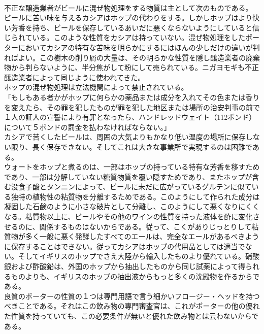 \documentclass[8pt]{extreport}
\begin{document}
\begin{CJK}{UTF8}{min}
\\	不正な醸造業者がビールに混ぜ物処理をする物質は主として次のものである。
\\	ビールに苦い味を与えるカシアはホップの代わりをする。しかしホップはより快い芳香を持ち、ビールを保存しているあいだに悪くならないようにしていると信じられている。このような性質をカシアは持っていない。混ぜ物処理をしたポーターにおいてカシアの特有な苦味を明らかにするにはほんの少しだけの違いが判ればよい。この樹木の削り屑の大量は、その明らかな性質を隠し醸造業者の廃棄物から判らないように、半分焦がして粉にして売られている。ニガヨモギも不正醸造業者によって同じように使われてきた。
\\	ホップの混ぜ物処理は立法機関によって禁止されている。
\\	「もしもある者かがホップに何らかの薬品または成分を入れてその色または香りを変えたら、その罪を犯したものが罪を犯した地区または場所の治安判事の前で１人の証人の宣誓により有罪となったら、ハンドレッドウェイト（112ポンド）について５ポンドの罰金を払わなければならない。」
\\	カシアで苦くしたビールは、周囲の大気よりもかなり低い温度の場所に保存しない限り、長く保存できない。そしてこれは大きな事業所で実現するのは困難である。
\\	ウォートをホップと煮るのは、一部はホップの持っている特有な芳香を移すためであり、一部は分解していない糖質物質を覆い隠すためであり、またホップが含む没食子酸とタンニンによって、ビールに未だに広がっているグルテンに似ている独特の植物性の粘質物を分離するためである。このようにして作られた成分は凝固した石鹸のように小さな破片として分離し、このようにして悪くなりにくくなる。粘質物以上に、ビールやその他のワインの性質を持った液体を酢に変化させるのに、関係するものはないからである。従って、こくがありじっとりして粘質物が多く一般に悪く発酵したすべてのエールは、完全なエールがあるべきように保存することはできない。従ってカシアはホップの代用品としては適当でない。そしてイギリスのホップでさえ大陸から輸入したものより優れている。硝酸銀および酢酸鉛は、外国のホップから抽出したものから同じ試薬によって得られるものよりも、イギリスのホップの抽出液からもっと多くの沈殿物を作るからである。
\\	良質のポーターの性質の１つは専門用語で言う細かいフロージー・ヘッドを持つべきことである。それはこの飲み物の専門審査官は、これがポーターの他の優れた性質を持っていても、この必要条件が無いと優れた飲み物とは云わないからである。

\end{CJK}
\end{document}
